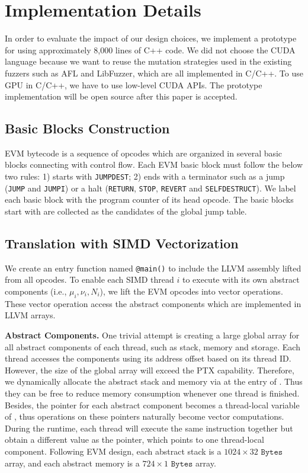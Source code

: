 \section{Implementation Details}

In order to evaluate the impact of our design choices, we implement a prototype for {\tool} using approximately 8,000 lines of C++ code.
We did not choose the CUDA language because we want to reuse the mutation strategies used in the existing fuzzers such as AFL and LibFuzzer, which are all implemented in C/C++. 
To use GPU in C/C++, we have to use low-level CUDA APIs\cite{nvidia2021cuda}.
The prototype implementation will be open source after this paper is accepted.


\subsection{Basic Blocks Construction}
\label{emcc:basicblocks}
EVM bytecode is a sequence of opcodes which are organized in several basic blocks connecting with control flow.
Each EVM basic block must follow the below two rules: 1) starts with \texttt{JUMPDEST}; 2) ends with a terminator such as a jump (\texttt{JUMP} and \texttt{JUMPI}) or a halt (\texttt{RETURN}, \texttt{STOP}, \texttt{REVERT} and \texttt{SELFDESTRUCT}).
We label each basic block with the program counter of its head opcode. 
The basic blocks start with  are collected as the candidates of the global jump table.

\subsection{Translation with SIMD Vectorization}
We create an entry function named \texttt{@main()} to include the LLVM assembly lifted from all opcodes.
To enable each SIMD thread $i$ to execute with its own abstract components (i.e., $\mu_i, \nu_i, N_i$), we lift the EVM opcodes into vector operations. 
These vector operation access the abstract components which are implemented in LLVM arrays.

\noindent\textbf{Abstract Components.}
One trivial attempt is creating a large global array for all abstract components of each thread, such as stack, memory and storage. Each thread accesses the components using its address offset based on its thread ID. 
However, the size of the global array will exceed the PTX capability. 
%
Therefore, we dynamically allocate the abstract stack and memory via  at the entry of . Thus they can be free to reduce memory consumption whenever one thread is finished.
%
Besides, the pointer for each abstract component becomes a thread-local variable of , thus operations on these pointers naturally become vector computations. 
%
During the runtime, each thread will execute the same  instruction together but obtain a different value as the pointer, which points to one thread-local component. 
%
Following EVM design, each abstract stack is a $1024 \times 32 \texttt{ Bytes}$ array, and each abstract memory is a $724 \times 1\texttt{ Bytes}$ array. 

